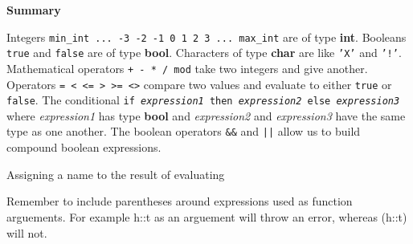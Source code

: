 \documentclass[12pt]{article}
\begin{document}
\begin{center}\LARGE\bf
    Summary
\end{center}

Integers \texttt{min_int ... -3 -2 -1 0 1 2 3 ... max_int} are of type \textbf{int}. Booleans \texttt{true}
and \texttt{false} are of type \textbf{bool}. Characters of type \textbf{char} are like \texttt{'X'} and
\texttt{'!'}. Mathematical operators \texttt{+ - * / mod} take two integers and give another. Operators
\texttt{= < <= > >= <>} compare two values and evaluate to either \texttt{true} or \texttt{false}.
The conditional \texttt{if \textit{expression1} then \textit{expression2} else \textit{expression3}}
where \textit{expression1} has type \textbf{bool} and \textit{expression2} and \textit{expression3} have the same type as one another.
The boolean operators \texttt{&&} and \texttt{||} allow us to build compound boolean expressions.

Assigning a name to the result of evaluating


Remember to include parentheses around expressions used as function arguements.
For example h::t as an arguement will throw an error, whereas (h::t) will not.
\end{document}
